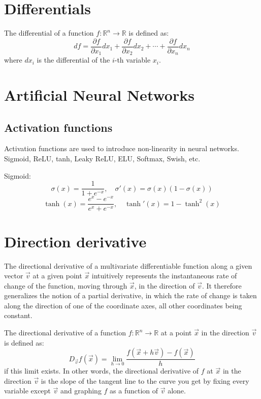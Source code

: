 \section{Differentials}
The differential of a function \( f: \mathbb{R}^n \rightarrow \mathbb{R} \) is defined as:
$$ df = \frac{\partial f}{\partial x_1} dx_1 + \frac{\partial f}{\partial x_2} dx_2 + \cdots + \frac{\partial f}{\partial x_n} dx_n $$
where \( dx_i \) is the differential of the \( i \)-th variable \( x_i \).

\section{Artificial Neural Networks}

\subsection{Activation functions}
Activation functions are used to introduce non-linearity in neural networks.
Sigmoid, ReLU, tanh, Leaky ReLU, ELU, Softmax, Swish, etc.

Sigmoid:
$$\sigma(x) = \frac{1}{1+e^{-x}}, \quad \sigma'(x) = \sigma(x)(1-\sigma(x))$$
$$\tanh(x) = \frac{e^x - e^{-x}}{e^x + e^{-x}}, \quad \tanh'(x) = 1 - \tanh^2(x)$$



\section{Direction derivative}
The directional derivative of a multivariate differentiable function along a given vector \( \vec{v} \) at a given point \( \vec{x} \) intuitively represents the instantaneous rate of change of the function, moving through \( \vec{x} \), in the direction of \( \vec{v} \). It therefore generalizes the notion of a partial derivative, in which the rate of change is taken along the direction of one of the coordinate axes, all other coordinates being constant.

The directional derivative of a function \( f: \mathbb{R}^n \rightarrow \mathbb{R} \) at a point \( \vec{x} \) in the direction \( \vec{v} \) is defined as:
$$
D_{\vec{v}} f(\vec{x}) = \lim_{h \rightarrow 0} \frac{f(\vec{x} + h\vec{v}) - f(\vec{x})}{h}
$$
if this limit exists. In other words, the directional derivative of \( f \) at \( \vec{x} \) in the direction \( \vec{v} \) is the slope of the tangent line to the curve you get by fixing every variable except \( \vec{v} \) and graphing \( f \) as a function of \( \vec{v} \) alone.

